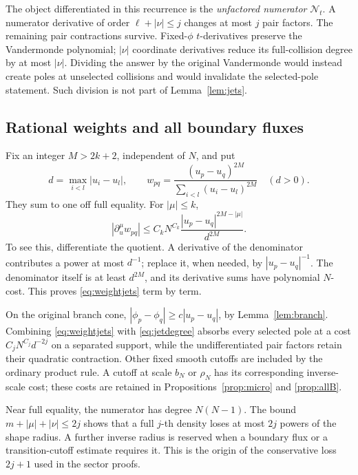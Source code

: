 \documentclass[11pt]{article}
\numberwithin{equation}{section}
\theoremstyle{definition}
\begin{document}
The object differentiated in this recurrence is the
\emph{unfactored numerator} \(\mathscr N_t\).
A numerator derivative of order \(\ell+|\nu|\le j\) changes at
most \(j\) pair factors. The remaining pair contractions survive.
Fixed-\(\phi\) \(t\)-derivatives preserve the Vandermonde polynomial;
\(|\nu|\) coordinate derivatives reduce its full-collision degree
by at most \(|\nu|\).
Dividing the answer by the original Vandermonde would instead
create poles at unselected collisions and would invalidate the
selected-pole statement. Such division is not part of
Lemma~\ref{lem:jets}.

\subsection{Rational weights and all boundary fluxes}
Fix an integer \(M>2k+2\), independent of \(N\), and put
\[
 d=\max_{i<l}|u_i-u_l|,\qquad
 w_{pq}=\frac{(u_p-u_q)^{2M}}
                  {\sum_{i<l}(u_i-u_l)^{2M}}\quad(d>0).
\]
They sum to one off full equality. For \(|\mu|\le k\),
\begin{equation}
 |\partial_u^\mu w_{pq}|
 \le C_kN^{C_k}
       \frac{|u_p-u_q|^{2M-|\mu|}}{d^{2M}}.
 \label{eq:weightjets}
\end{equation}
To see this, differentiate the quotient. A derivative of the
denominator contributes a power at most \(d^{-1}\); replace it,
when needed, by \(|u_p-u_q|^{-1}\). The denominator itself is
at least \(d^{2M}\), and its derivative sums have polynomial
\(N\)-cost. This proves \eqref{eq:weightjets} term by term.

On the original branch cone,
\(|\phi_p-\phi_q|\ge c|u_p-u_q|\), by
Lemma~\ref{lem:branch}. Combining \eqref{eq:weightjets} with
\eqref{eq:jetdegree} absorbs every selected pole at a cost
\(C_jN^{C_j}d^{-2j}\) on a separated support, while the
undifferentiated pair factors retain their quadratic contraction.
Other fixed smooth cutoffs are included by the ordinary product
rule. A cutoff at scale \(b_N\) or \(\rho_N\) has its corresponding
inverse-scale cost; these costs are retained in
Propositions~\ref{prop:micro} and \ref{prop:allB}.

Near full equality, the numerator has degree \(N(N-1)\).
The bound \(m+|\mu|+|\nu|\le2j\) shows that a full \(j\)-th
density loses at most \(2j\) powers of the shape radius.
A further inverse radius is reserved when a boundary flux or
a transition-cutoff estimate requires it. This is the origin
of the conservative loss \(2j+1\) used in the sector proofs.
\end{document}
